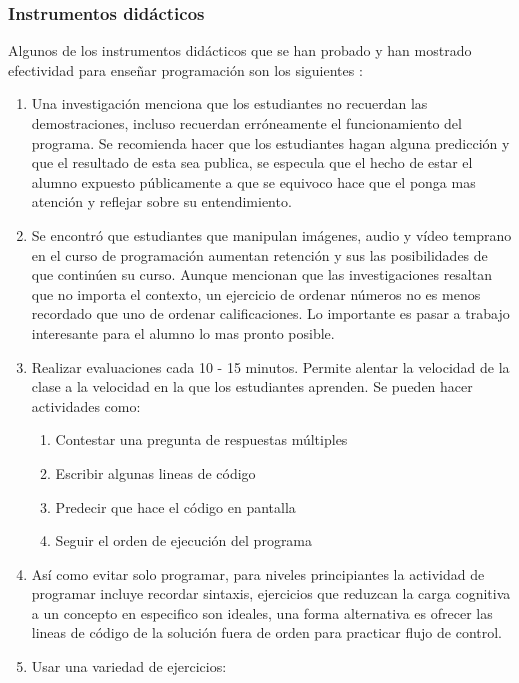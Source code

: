 \subsubsection{Instrumentos didácticos}
Algunos de los instrumentos didácticos que se han probado y han mostrado efectividad para enseñar programación son los siguientes \cite{Wilson2019} \cite{Brown2018}:
\begin{enumerate}
    \item Una investigación \cite{Brown2018} menciona que los estudiantes no recuerdan las demostraciones, incluso recuerdan erróneamente el funcionamiento del programa. Se recomienda hacer que los estudiantes hagan alguna predicción y que el resultado de esta sea publica, se especula que el hecho de estar el alumno expuesto públicamente a que se equivoco hace que el ponga mas atención y reflejar sobre su entendimiento.
    \item Se encontró que estudiantes que manipulan imágenes, audio y vídeo temprano en el curso de programación aumentan retención y sus las posibilidades de que continúen su curso. Aunque mencionan que las investigaciones resaltan que no importa el contexto, un ejercicio de ordenar números no es menos recordado que uno de ordenar calificaciones. Lo importante es pasar a trabajo interesante para el alumno lo mas pronto posible.
    \item Realizar evaluaciones cada 10 - 15 minutos. Permite alentar la velocidad de la clase a la velocidad en la que los estudiantes aprenden. Se pueden hacer actividades como:
        \begin{enumerate}
            \item Contestar una pregunta de respuestas múltiples
            \item Escribir algunas lineas de código
            \item Predecir que hace el código en pantalla
            \item Seguir el orden de ejecución del programa
        \end{enumerate}
    \item Así como evitar solo programar, para niveles principiantes la actividad de programar incluye recordar sintaxis, ejercicios que reduzcan la carga cognitiva a un concepto en especifico son ideales, una forma alternativa es ofrecer las lineas de código de la solución fuera de orden para practicar flujo de control.
    \item Usar una variedad de ejercicios:
        \begin{enumerate}

\end{enumerate}
\end{enumerate}
